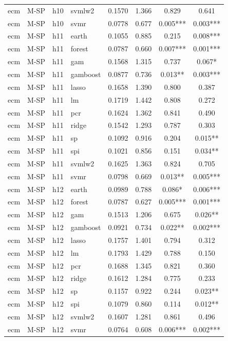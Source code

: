 \begin{ThreePartTable}
\begin{longtable}[t]{llclcccc}
ecm & M-SP & h10 & svmlw2 & 0.1570 & 1.366 & 0.829 & 0.641\\
ecm & M-SP & h10 & svmr & 0.0778 & 0.677 & 0.005*** & 0.003***\\
\addlinespace
ecm & M-SP & h11 & earth & 0.1055 & 0.885 & 0.215 & 0.008***\\
ecm & M-SP & h11 & forest & 0.0787 & 0.660 & 0.007*** & 0.001***\\
ecm & M-SP & h11 & gam & 0.1568 & 1.315 & 0.737 & 0.067*\\
ecm & M-SP & h11 & gamboost & 0.0877 & 0.736 & 0.013** & 0.003***\\
ecm & M-SP & h11 & lasso & 0.1658 & 1.390 & 0.800 & 0.387\\
ecm & M-SP & h11 & lm & 0.1719 & 1.442 & 0.808 & 0.272\\
ecm & M-SP & h11 & pcr & 0.1624 & 1.362 & 0.841 & 0.490\\
ecm & M-SP & h11 & ridge & 0.1542 & 1.293 & 0.787 & 0.303\\
ecm & M-SP & h11 & sp & 0.1092 & 0.916 & 0.204 & 0.015**\\
ecm & M-SP & h11 & spi & 0.1021 & 0.856 & 0.151 & 0.034**\\
ecm & M-SP & h11 & svmlw2 & 0.1625 & 1.363 & 0.824 & 0.705\\
ecm & M-SP & h11 & svmr & 0.0798 & 0.669 & 0.013** & 0.005***\\
\addlinespace
ecm & M-SP & h12 & earth & 0.0989 & 0.788 & 0.086* & 0.006***\\
ecm & M-SP & h12 & forest & 0.0787 & 0.627 & 0.005*** & 0.001***\\
ecm & M-SP & h12 & gam & 0.1513 & 1.206 & 0.675 & 0.026**\\
ecm & M-SP & h12 & gamboost & 0.0921 & 0.734 & 0.022** & 0.002***\\
ecm & M-SP & h12 & lasso & 0.1757 & 1.401 & 0.794 & 0.312\\
ecm & M-SP & h12 & lm & 0.1793 & 1.429 & 0.788 & 0.150\\
ecm & M-SP & h12 & pcr & 0.1688 & 1.345 & 0.821 & 0.360\\
ecm & M-SP & h12 & ridge & 0.1612 & 1.284 & 0.775 & 0.233\\
ecm & M-SP & h12 & sp & 0.1157 & 0.922 & 0.244 & 0.023**\\
ecm & M-SP & h12 & spi & 0.1079 & 0.860 & 0.114 & 0.012**\\
ecm & M-SP & h12 & svmlw2 & 0.1607 & 1.281 & 0.861 & 0.496\\
ecm & M-SP & h12 & svmr & 0.0764 & 0.608 & 0.006*** & 0.002***\\

\end{longtable}
\end{ThreePartTable}
